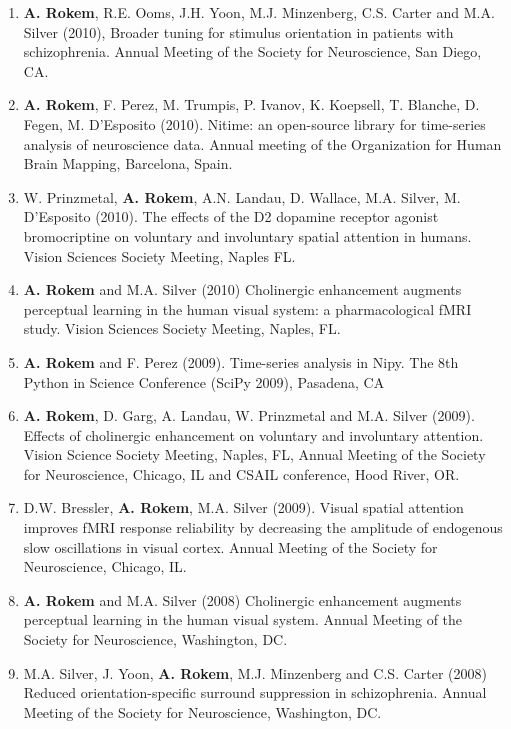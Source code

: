 \documentclass[11pt,fullpage]{article}
\begin{document}
\begin{enumerate}
\item {\bf A. Rokem}, R.E. Ooms, J.H. Yoon, M.J. Minzenberg, C.S. Carter and M.A. Silver (2010), Broader tuning for stimulus orientation in patients with schizophrenia. Annual Meeting of the Society for Neuroscience, San Diego, CA.

\item {\bf A. Rokem}, F. Perez, M. Trumpis, P. Ivanov, K. Koepsell, T. Blanche, D. Fegen, M. D'Esposito (2010). Nitime: an open-source library for time-series analysis of neuroscience data. Annual meeting of the Organization for Human Brain Mapping, Barcelona, Spain.

\item W. Prinzmetal, {\bf A. Rokem}, A.N. Landau, D. Wallace, M.A. Silver, M. D’Esposito (2010). The effects of the D2 dopamine receptor agonist bromocriptine on voluntary and involuntary spatial attention in humans. Vision Sciences Society Meeting, Naples FL.

\item {\bf A. Rokem} and M.A. Silver (2010) Cholinergic enhancement augments perceptual learning in the human visual system: a pharmacological fMRI study. Vision Sciences Society Meeting, Naples, FL.

\item {\bf A. Rokem} and F. Perez (2009). Time-series analysis in Nipy. The 8th Python in Science Conference (SciPy 2009), Pasadena, CA

\item {\bf A. Rokem}, D. Garg, A. Landau, W. Prinzmetal and M.A. Silver (2009). Effects of cholinergic enhancement on voluntary and involuntary attention. Vision Science Society Meeting, Naples, FL, Annual Meeting of the Society for Neuroscience, Chicago, IL and CSAIL conference, Hood River, OR.

\item D.W. Bressler, {\bf A. Rokem}, M.A. Silver (2009). Visual spatial attention improves fMRI response reliability by decreasing the amplitude of endogenous slow oscillations in visual cortex. Annual Meeting of the Society for Neuroscience, Chicago, IL.

\item {\bf A. Rokem} and M.A. Silver (2008) Cholinergic enhancement augments perceptual learning in the human visual system. Annual Meeting of the Society for Neuroscience, Washington, DC.

\item M.A. Silver, J. Yoon, {\bf A. Rokem}, M.J. Minzenberg and C.S. Carter (2008) Reduced orientation-specific surround suppression in schizophrenia. Annual Meeting of the Society for Neuroscience, Washington, DC.


\end{enumerate}
\end{document}
